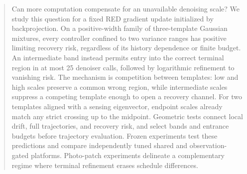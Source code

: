 \begin{abstract}
Can more computation compensate for an unavailable denoising scale?
We study this question for a fixed RED gradient update initialized
by backprojection. On a positive-width family of three-template
Gaussian mixtures, every controller confined to two variance ranges
has positive limiting recovery risk, regardless of its history
dependence or finite budget. An intermediate band instead permits
entry into the correct terminal region in at most 25 denoiser calls,
followed by logarithmic refinement to vanishing risk.
The mechanism is competition between templates: low and high scales
preserve a common wrong region, while intermediate scales suppress
a competing template enough to open a recovery channel.
For two templates aligned with a sensing eigenvector, endpoint
scales already match any strict crossing up to the midpoint.
Geometric tests connect local drift, full trajectories, and recovery
risk, and select bands and entrance budgets before trajectory
evaluation. Frozen experiments test these predictions and compare
independently tuned shared and observation-gated platforms.
Photo-patch experiments delineate a complementary regime where
terminal refinement erases schedule differences.
\end{abstract}
